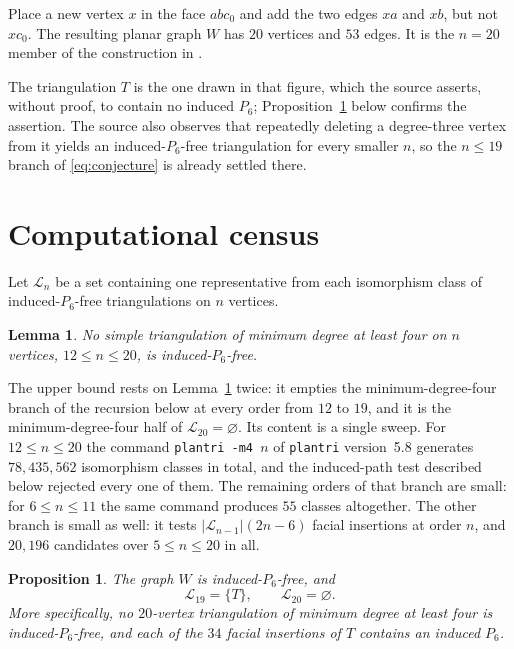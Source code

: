 \documentclass[11pt]{amsart}
\newtheorem{proposition}[theorem]{Proposition}
\newtheorem{lemma}[theorem]{Lemma}
\newcommand{\cL}{\mathcal L}
\begin{document}
Place a new vertex $x$ in the face $abc_0$ and add the two edges $xa$ and
$xb$, but not $xc_0$. The resulting planar graph $W$ has $20$ vertices
and $53$ edges. It is the $n=20$ member of the construction in
\cite[Figure~5 and the preceding paragraph]{GyoriKarim}.

The triangulation $T$ is the one drawn in that figure, which the source
asserts, without proof, to contain no induced $P_6$;
Proposition~\ref{prop:census} below confirms the assertion. The source also
observes that repeatedly deleting a degree-three vertex from it yields an
induced-$P_6$-free triangulation for every smaller $n$, so the $n\leq 19$
branch of \eqref{eq:conjecture} is already settled there.

\section{Computational census}

Let $\cL_n$ be a set containing one representative from each isomorphism
class of induced-$P_6$-free triangulations on $n$ vertices.

\begin{lemma}\label{lem:m4}
No simple triangulation of minimum degree at least four on $n$ vertices,
$12\leq n\leq 20$, is induced-$P_6$-free.
\end{lemma}

The upper bound rests on Lemma~\ref{lem:m4} twice: it empties the
minimum-degree-four branch of the recursion below at every order from $12$ to
$19$, and it is the minimum-degree-four half of $\cL_{20}=\varnothing$. Its
content is a single sweep. For $12\leq n\leq 20$ the command
\texttt{plantri -m4 $n$} of \texttt{plantri} version~5.8 generates
$78{,}435{,}562$ isomorphism classes in total, and the induced-path test
described below rejected every one of them. The remaining orders of that
branch are small: for $6\leq n\leq 11$ the same command produces $55$ classes
altogether. The other branch is small as well: it tests $|\cL_{n-1}|(2n-6)$
facial insertions at order $n$, and $20{,}196$ candidates over
$5\leq n\leq 20$ in all.

\begin{proposition}\label{prop:census}
The graph $W$ is induced-$P_6$-free, and
\[
  \cL_{19}=\{T\},\qquad \cL_{20}=\varnothing.
\]
More specifically, no $20$-vertex triangulation of minimum degree at least
four is induced-$P_6$-free, and each of the $34$ facial insertions of $T$
contains an induced $P_6$.
\end{proposition}
\end{document}
